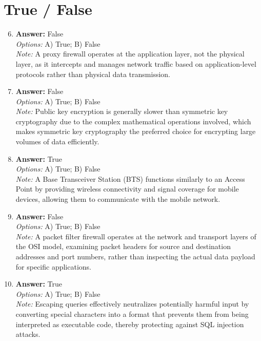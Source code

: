 \documentclass[12pt]{article}
\begin{document}
\section*{True / False}
\begin{enumerate}[label=\arabic*.]
\setcounter{enumi}{5}
\item \textbf{Answer:} False
\\ \textit{Options:} A) True; B) False
\\ \textit{Note:} A proxy firewall operates at the application layer, not the physical layer, as it intercepts and manages network traffic based on application-level protocols rather than physical data transmission.
\item \textbf{Answer:} False
\\ \textit{Options:} A) True; B) False
\\ \textit{Note:} Public key encryption is generally slower than symmetric key cryptography due to the complex mathematical operations involved, which makes symmetric key cryptography the preferred choice for encrypting large volumes of data efficiently.
\item \textbf{Answer:} True
\\ \textit{Options:} A) True; B) False
\\ \textit{Note:} A Base Transceiver Station (BTS) functions similarly to an Access Point by providing wireless connectivity and signal coverage for mobile devices, allowing them to communicate with the mobile network.
\item \textbf{Answer:} False
\\ \textit{Options:} A) True; B) False
\\ \textit{Note:} A packet filter firewall operates at the network and transport layers of the OSI model, examining packet headers for source and destination addresses and port numbers, rather than inspecting the actual data payload for specific applications.
\item \textbf{Answer:} True
\\ \textit{Options:} A) True; B) False
\\ \textit{Note:} Escaping queries effectively neutralizes potentially harmful input by converting special characters into a format that prevents them from being interpreted as executable code, thereby protecting against SQL injection attacks.
\end{enumerate}
\end{document}
